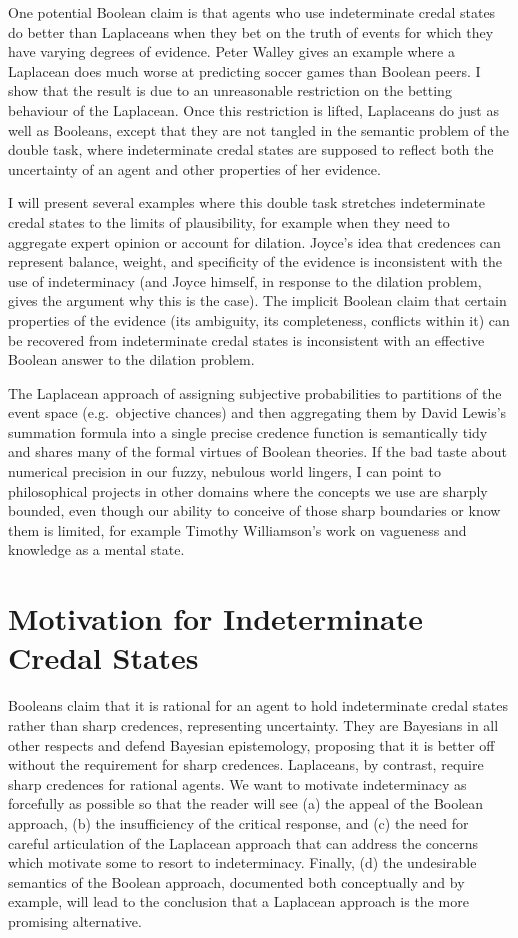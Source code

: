 One potential Boolean claim is that agents who use
indeterminate credal states do better than Laplaceans
when they bet on the truth of events for which they
have varying degrees of evidence. Peter Walley gives an
example where a Laplacean does much worse at predicting
soccer games than Boolean peers. I show that the result
is due to an unreasonable restriction on the betting
behaviour of the Laplacean. Once this restriction is
lifted, Laplaceans do just as well as Booleans, except
that they are not tangled in the semantic problem of
the double task, where indeterminate credal states are
supposed to reflect both the uncertainty of an agent
and other properties of her evidence.

I will present several examples where this double task
stretches indeterminate credal states to the limits of
plausibility, for example when they need to aggregate
expert opinion or account for dilation. Joyce's idea
that credences can represent balance, weight, and
specificity of the evidence is inconsistent with the
use of indeterminacy (and Joyce himself, in response to
the dilation problem, gives the argument why this is
the case). The implicit Boolean claim that certain
properties of the evidence (its ambiguity, its
completeness, conflicts within it) can be recovered
from indeterminate credal states is inconsistent with
an effective Boolean answer to the dilation problem.

The Laplacean approach of assigning subjective
probabilities to partitions of the event space (e.g.\
objective chances) and then aggregating them by David
Lewis's summation formula into a single precise
credence function is semantically tidy and shares many
of the formal virtues of Boolean theories. If the bad
taste about numerical precision in our fuzzy, nebulous
world lingers, I can point to philosophical projects in
other domains where the concepts we use are sharply
bounded, even though our ability to conceive of those
sharp boundaries or know them is limited, for example
Timothy Williamson's work on vagueness and knowledge as
a mental state.

\section{Motivation for Indeterminate Credal States}
\label{MotivationForIndeterminateCredalStates}

Booleans claim that it is rational for an agent to hold
indeterminate credal states rather than sharp
credences, representing uncertainty. They are Bayesians
in all other respects and defend Bayesian epistemology,
proposing that it is better off without the requirement
for sharp credences. Laplaceans, by contrast, require
sharp credences for rational agents. We want to
motivate indeterminacy as forcefully as possible so
that the reader will see (a) the appeal of the Boolean
approach, (b) the insufficiency of the critical
response, and (c) the need for careful articulation of
the Laplacean approach that can address the concerns
which motivate some to resort to indeterminacy.
Finally, (d) the undesirable semantics of the Boolean
approach, documented both conceptually and by example,
will lead to the conclusion that a Laplacean approach
is the more promising alternative.

